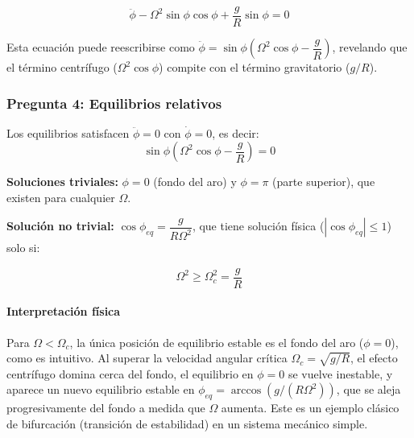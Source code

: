\begin{sol}
$$\boxed{\ddot\phi - \Omega^2\sin\phi\cos\phi + \frac{g}{R}\sin\phi = 0}$$

Esta ecuación puede reescribirse como $\ddot\phi = \sin\phi\left(\Omega^2\cos\phi - \dfrac{g}{R}\right)$, revelando que el término centrífugo ($\Omega^2\cos\phi$) compite con el término gravitatorio ($g/R$).

\subsubsection*{Pregunta 4: Equilibrios relativos}

Los equilibrios satisfacen $\ddot\phi = 0$ con $\dot\phi = 0$, es decir:
$$\sin\phi\left(\Omega^2\cos\phi - \frac{g}{R}\right) = 0$$

\textbf{Soluciones triviales:} $\phi = 0$ (fondo del aro) y $\phi = \pi$ (parte superior), que existen para cualquier $\Omega$.

\textbf{Solución no trivial:} $\cos\phi_{eq} = \dfrac{g}{R\Omega^2}$, que tiene solución física ($|\cos\phi_{eq}| \leq 1$) solo si:

$$\boxed{\Omega^2 \geq \Omega_c^2 = \frac{g}{R}}$$

\paragraph{Interpretación física} Para $\Omega < \Omega_c$, la única posición de equilibrio estable es el fondo del aro ($\phi=0$), como es intuitivo. Al superar la velocidad angular crítica $\Omega_c = \sqrt{g/R}$, el efecto centrífugo domina cerca del fondo, el equilibrio en $\phi=0$ se vuelve inestable, y aparece un nuevo equilibrio estable en $\phi_{eq} = \arccos(g/(R\Omega^2))$, que se aleja progresivamente del fondo a medida que $\Omega$ aumenta. Este es un ejemplo clásico de bifurcación (transición de estabilidad) en un sistema mecánico simple.

\end{sol}
